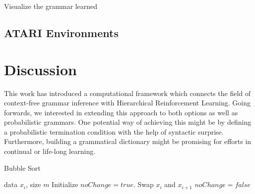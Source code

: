 \documentclass{article}
\begin{document}
Visualize the grammar learned

\subsection{ATARI Environments}

\newpage
\section{Discussion}

This work has introduced a computational framework which connects the field of context-free grammar inference with Hierarchical Reinforcement Learning. Going forwards, we interested in extending this approach to both options as well as probabilistic grammars. One potential way of achieving this might be by defining a probabilistic termination condition with the help of syntactic surprise\citep{Hale_2003, Hale_2006}. Furthermore, building a grammatical dictionary might be promising for efforts in continual or life-long learning.

\begin{algorithm}[H]
   \caption{Bubble Sort}
   \label{alg:example}
\begin{algorithmic}
    data $x_i$, size $m$
   \REPEAT
   \STATE Initialize $noChange = true$.
   \STATE Swap $x_i$ and $x_{i+1}$
   \STATE $noChange = false$
   \ENDIF
   \ENDFOR
\end{algorithmic}
\end{algorithm}


\newpage


\end{document}
